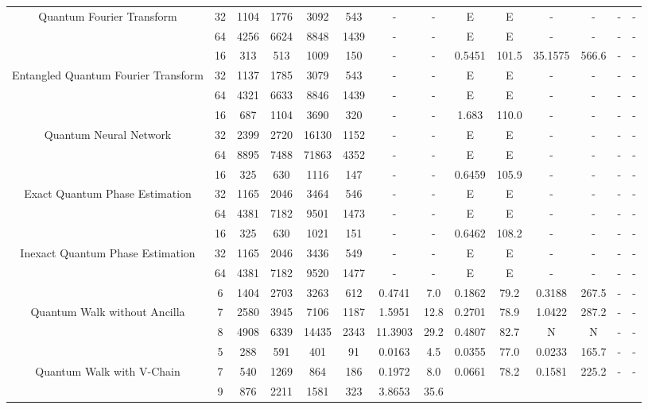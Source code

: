 \begin{table}[htb]
{\begin{tabular}{|c|c|c|c|c|c|c|c|c|c|c|c|c|c|}
Quantum Fourier Transform & 
32 & 1104 & 1776 & 3092 & 543
 & - & -
 & E & E
 & - & -
 & - & -
 \\
 & 
64 & 4256 & 6624 & 8848 & 1439
 & - & -
 & E & E
 & - & -
 & - & -
 \\
\hline
 & 
16 & 313 & 513 & 1009 & 150
 & - & -
 & 0.5451 & 101.5
 & 35.1575 & 566.6
 & - & -
 \\
Entangled Quantum Fourier Transform & 
32 & 1137 & 1785 & 3079 & 543
 & - & -
 & E & E
 & - & -
 & - & -
 \\
 & 
64 & 4321 & 6633 & 8846 & 1439
 & - & -
 & E & E
 & - & -
 & - & -
 \\
\hline
 & 
16 & 687 & 1104 & 3690 & 320
 & - & -
 & 1.683 & 110.0
 & - & -
 & - & -
 \\
Quantum Neural Network & 
32 & 2399 & 2720 & 16130 & 1152
 & - & -
 & E & E
 & - & -
 & - & -
 \\
 & 
64 & 8895 & 7488 & 71863 & 4352
 & - & -
 & E & E
 & - & -
 & - & -
 \\
\hline
 & 
16 & 325 & 630 & 1116 & 147
 & - & -
 & 0.6459 & 105.9
 & - & -
 & - & -
 \\
Exact Quantum Phase Estimation & 
32 & 1165 & 2046 & 3464 & 546
 & - & -
 & E & E
 & - & -
 & - & -
 \\
 & 
64 & 4381 & 7182 & 9501 & 1473
 & - & -
 & E & E
 & - & -
 & - & -
 \\
\hline
 & 
16 & 325 & 630 & 1021 & 151
 & - & -
 & 0.6462 & 108.2
 & - & -
 & - & -
 \\
Inexact Quantum Phase Estimation & 
32 & 1165 & 2046 & 3436 & 549
 & - & -
 & E & E
 & - & -
 & - & -
 \\
 & 
64 & 4381 & 7182 & 9520 & 1477
 & - & -
 & E & E
 & - & -
 & - & -
 \\
\hline
 & 
6 & 1404 & 2703 & 3263 & 612
 & 0.4741 & 7.0
 & 0.1862 & 79.2
 & 0.3188 & 267.5
 & - & -
 \\
Quantum Walk without Ancilla & 
7 & 2580 & 3945 & 7106 & 1187
 & 1.5951 & 12.8
 & 0.2701 & 78.9
 & 1.0422 & 287.2
 & - & -
 \\
 & 
8 & 4908 & 6339 & 14435 & 2343
 & 11.3903 & 29.2
 & 0.4807 & 82.7
 & N & N 
 & - & -
 \\
\hline
 & 
5 & 288 & 591 & 401 & 91
 & 0.0163 & 4.5
 & 0.0355 & 77.0
 & 0.0233 & 165.7
 & - & -
 \\
Quantum Walk with V-Chain & 
7 & 540 & 1269 & 864 & 186
 & 0.1972 & 8.0
 & 0.0661 & 78.2
 & 0.1581 & 225.2
 & - & -
 \\
 & 
9 & 876 & 2211 & 1581 & 323
 & 3.8653 & 35.6

\end{tabular}}
\end{table}
